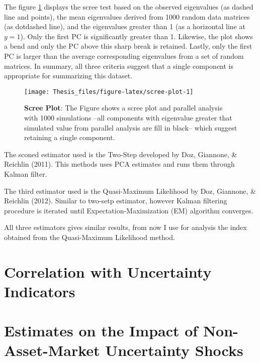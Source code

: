 \documentclass[12pt,twoside]{reedthesis}
\begin{document}
The figure \ref{fig:scree-plot} displays the scree test based on the observed eigenvalues (as dashed line and points), the mean eigenvalues derived from 1000 random data matrices (as dotdashed line), and the eigenvalues greater than 1 (as a horizontal line at \(y = 1\)). Only the first PC is significantly greater than 1. Likewise, the plot shows a bend and only the PC above this sharp break is retained. Lastly, only the first PC is larger than the average corresponding eigenvalues from a set of random matrices. In summary, all three criteria suggest that a single component is appropriate for summarizing this dataset.


\begin{figure}

{\centering \texttt{[image: Thesis\_files/figure-latex/scree-plot-1]} 

}

\caption[Scree Plot]{\textbf{Scree Plot}: The Figure shows a scree plot and parallel analysis with 1000 simulations --all components with eigenvalue greater that simulated value from parallel analysis are fill in black-- which suggest retaining a single component.}\label{fig:scree-plot}
\end{figure}
The sconed estimator used is the Two-Step developed by Doz, Giannone, \& Reichlin (2011). This methods uses PCA estimates and runs them through Kalman filter.

The third estimator used is the Quasi-Maximum Likelihood by Doz, Giannone, \& Reichlin (2012). Similar to two-setp estimator, however Kalman filtering procedure is iterated until Expectation-Maximization (EM) algorithm converges.

All three estimators gives similar results, from now I use for analysis the index obtained from the Quasi-Maximum Likelihood method.

\hypertarget{correlatio-with-uncertainty-indicators}{%
\section{Correlation with Uncertainty Indicators}\label{correlatio-with-uncertainty-indicators}}

\hypertarget{var-baseline}{%
\section{Estimates on the Impact of Non-Asset-Market Uncertainty Shocks}\label{var-baseline}}
\end{document}
